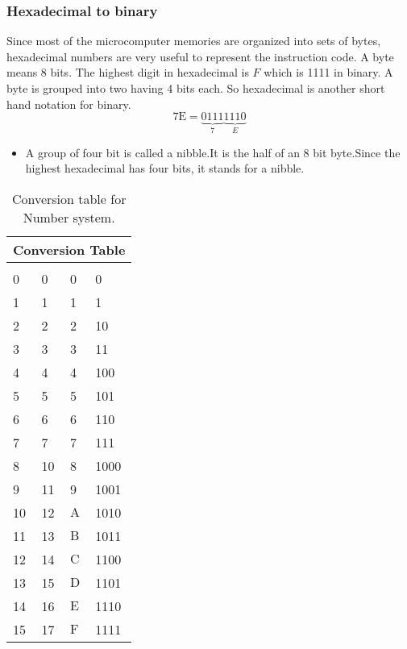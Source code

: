\subsubsection{Hexadecimal to binary}
Since most of the microcomputer memories are organized into sets of bytes, hexadecimal numbers are very useful to represent the instruction code. A byte means 8 bits. The highest digit in hexadecimal is $F$ which is 1111 in binary. A byte is grouped into two having 4 bits each. So hexadecimal is another short hand notation for binary.
$$
7 \mathrm{E}=\underbrace{0111}_{7} \underbrace{1110}_{E}
$$

\begin{note}
	\begin{itemize}
		\item A group of four bit is called a nibble.It is the half of an 8 bit byte.Since the highest hexadecimal has four bits, it stands for a nibble.
	\end{itemize}
\end{note}

\setlength\arrayrulewidth{1pt}
\begin{table}[H]
	\centering
	\begin{tabular}{|p{2cm}|p{2cm}|p{2cm}|p{2cm}|}
		\hline
		\multicolumn{4}{|c|}{\textbf{Conversion Table}}\\\hline
		\hline \text {Decimal } & \text {Octal } & \text {Hexadecimal } & \text {Binary } \\
		\hline 0 & 0 & 0 & 0 \\
		1 & 1 & 1 & 1 \\
		2 & 2 & 2 & 10 \\
		3 & 3 & 3 & 11 \\
		4 & 4 & 4 & 100 \\
		5 & 5 & 5 & 101 \\
		6 & 6 & 6 & 110 \\
		7 & 7 & 7 & 111 \\
		8 & 10 & 8 & 1000 \\
		9 & 11 & 9 & 1001 \\
		10 & 12 & $\mathrm{A}$ & 1010 \\
		11 & 13 & $\mathrm{B}$ & 1011 \\
		12 & 14 & $\mathrm{C}$ & 1100 \\
		13 & 15 & $\mathrm{D}$ & 1101 \\
		14 & 16 & $\mathrm{E}$ & 1110 \\
		15 & 17 & $\mathrm{F}$ & 1111 \\
		\hline
		
	\end{tabular}
	\caption{Conversion table for Number system.}
\end{table}

